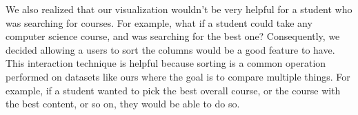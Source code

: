 \documentclass{article}
\begin{document}
We also realized that our visualization wouldn't be very helpful for a student who was searching for courses. For example, what if a student could take any computer science course, and was searching for the best one? Consequently, we decided allowing a users to sort the columns would be a good feature to have. This interaction technique is helpful because sorting is a common operation performed on datasets like ours where the goal is to compare multiple things. For example, if a student wanted to pick the best overall course, or the course with the best content, or so on, they would be able to do so.
\end{document}
